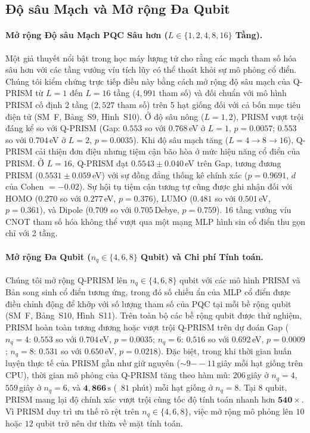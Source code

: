 \documentclass[10pt,twocolumn,letterpaper]{article}
\begin{document}
\subsection{Độ sâu Mạch và Mở rộng Đa Qubit}
\label{sec:depth_qubit_scaling}

\paragraph{Mở rộng Độ sâu Mạch PQC Sâu hơn ($L \in \{1, 2, 4, 8, 16\}$ Tầng).}
Một giả thuyết nổi bật trong học máy lượng tử cho rằng các mạch tham số hóa sâu hơn với các tầng vướng víu tích lũy có thể thoát khỏi sự mô phỏng cổ điển. Chúng tôi kiểm chứng trực tiếp điều này bằng cách mở rộng độ sâu mạch của Q-PRISM từ $L = 1$ đến $L = 16$ tầng ($4{,}991$ tham số) và đối chuẩn với mô hình PRISM cố định 2 tầng ($2{,}527$ tham số) trên 5 hạt giống đối với cả bốn mục tiêu điện tử (SM~F, Bảng~S9, Hình~S10).
Ở độ sâu nông ($L = 1, 2$), PRISM vượt trội đáng kể so với Q-PRISM (Gap: $0.553$ so với $0.768$\,eV ở $L=1$, $p = 0.0057$; $0.553$ so với $0.704$\,eV ở $L=2$, $p = 0.0035$). Khi độ sâu mạch tăng ($L = 4 \to 8 \to 16$), Q-PRISM cải thiện đơn điệu nhưng tiệm cận bão hòa ở mức hiệu năng cổ điển của PRISM. Ở $L = 16$, Q-PRISM đạt $0.5543 \pm 0.040$\,eV trên Gap, tương đương PRISM ($0.5531 \pm 0.059$\,eV) với sự đồng đẳng thống kê chính xác ($p = 0.9691$, $d$ của Cohen $= -0.02$). Sự hội tụ tiệm cận tương tự cũng được ghi nhận đối với HOMO ($0.270$ so với $0.277$\,eV, $p = 0.376$), LUMO ($0.481$ so với $0.501$\,eV, $p = 0.361$), và Dipole ($0.709$ so với $0.705$\,Debye, $p = 0.759$). 16 tầng vướng víu CNOT tham số hóa không thể vượt qua một mạng MLP hình sin cổ điển thu gọn chỉ với 2 tầng.

\paragraph{Mở rộng Đa Qubit ($n_q \in \{4, 6, 8\}$ Qubit) và Chi phí Tính toán.}
Chúng tôi mở rộng Q-PRISM lên $n_q \in \{4, 6, 8\}$ qubit với các mô hình PRISM và Bản song sinh cổ điển tương ứng, trong đó số chiều ẩn của MLP cổ điển được điều chỉnh động để khớp với số lượng tham số của PQC tại mỗi bề rộng qubit (SM~F, Bảng~S10, Hình~S11). Trên toàn bộ các bề rộng qubit được thử nghiệm, PRISM hoàn toàn tương đương hoặc vượt trội Q-PRISM trên dự đoán Gap ($n_q = 4$: $0.553$ so với $0.704$\,eV, $p = 0.0035$; $n_q = 6$: $0.516$ so với $0.692$\,eV, $p = 0.0009$; $n_q = 8$: $0.531$ so với $0.650$\,eV, $p = 0.0218$).
Đặc biệt, trong khi thời gian huấn luyện thực tế của PRISM gần như giữ nguyên ($\sim 9\mathrm{--}11$\,giây mỗi hạt giống trên CPU), thời gian mô phỏng của Q-PRISM tăng theo hàm mũ: $206$\,giây ở $n_q = 4$, $559$\,giây ở $n_q = 6$, và $\mathbf{4{,}866\,\mathrm{s}}$ (~$81$ phút) mỗi hạt giống ở $n_q = 8$. Tại 8 qubit, PRISM mang lại độ chính xác vượt trội cùng tốc độ tính toán nhanh hơn $\mathbf{540\times}$. Vì PRISM duy trì ưu thế rõ rệt trên $n_q \in \{4, 6, 8\}$, việc mở rộng mô phỏng lên $10$ hoặc $12$ qubit trở nên dư thừa về mặt tính toán.
\end{document}
